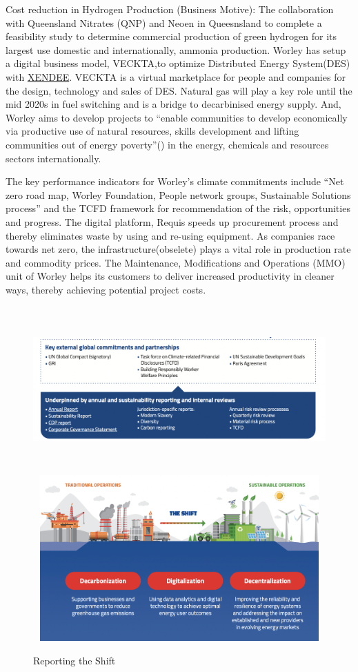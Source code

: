 \documentclass[11pt,a4paper,]{article}
\begin{document}
Cost reduction in Hydrogen Production (Business Motive): The collaboration with Queensland Nitrates (QNP) and Neoen in Queesnsland to complete a feasibility study to determine commercial production of green hydrogen for its largest use domestic and internationally, ammonia production. Worley has setup a digital business model, VECKTA,to optimize Distributed Energy System(DES) with \href{https://xendee.com/}{XENDEE}. VECKTA is a virtual marketplace for people and companies for the design, technology and sales of DES. Natural gas will play a key role until the mid 2020s in fuel switching and is a bridge to decarbinised energy supply. And, Worley aims to develop projects to ``enable communities to develop economically via productive use of natural resources, skills development and lifting communities out of energy poverty''(\textcite{sustainabilityreport2020}) in the energy, chemicals and resources sectors internationally.

The key performance indicators for Worley's climate commitments include ``Net zero road map, Worley Foundation, People network groups, Sustainable Solutions process'' \textcite{sustainabilityreport2020} and the TCFD framework for recommendation of the risk, opportunities and progress. The digital platform, Requis speeds up procurement process and thereby eliminates waste by using and re-using equipment. As companies race towards net zero, the infrastructure(obselete) plays a vital role in production rate and commodity prices. The Maintenance, Modifications and Operations (MMO) unit of Worley helps its customers to deliver increased productivity in cleaner ways, thereby achieving potential project costs.

\begin{figure}[H]
\includegraphics[width=5in, height = 2.5in]{Figures/reporting}
\includegraphics[width=5in, height = 2.5in]{Figures/shift}
\caption{Reporting the Shift}
\label{fig:reporting}
\end{figure}
\end{document}
